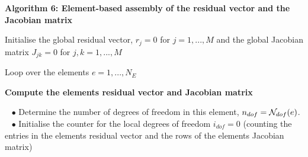 \begin{center} {\bfseries  Algorithm 6\+: Element-\/based assembly of the residual vector and the Jacobian matrix } \end{center} 
\begin{DoxyItemize}
\item Initialise the global residual vector, $ r_j=0 $ for $j=1,...,M $ and the global Jacobian matrix $ J_{jk}=0 $ for $j,k=1,...,M $
\item Loop over the elements $ e=1,...,N_E$ ~\newline
~\newline
 \begin{center} {\bfseries  Compute the element\textquotesingle{}s residual vector and Jacobian matrix } \end{center}  ~\newline
 $ \bullet $ Determine the number of degrees of freedom in this element, $ n_{dof}={\cal N}_{dof}(e) $. ~\newline
 $ \bullet $ Initialise the counter for the local degrees of freedom $ i_{dof}=0$ (counting the entries in the element\textquotesingle{}s residual vector and the rows of the element\textquotesingle{}s Jacobian matrix) ~\newline


\end{DoxyItemize}
